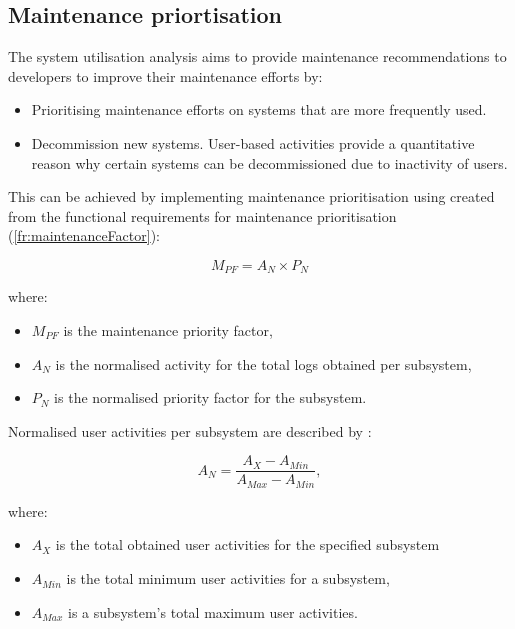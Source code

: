 \subsection{Maintenance priortisation}
The system utilisation analysis aims to provide maintenance recommendations to developers to improve their maintenance efforts by:

\begin{itemize}
	\item Prioritising maintenance efforts on systems that are more frequently used.
	\item Decommission new systems. User-based activities provide a quantitative reason why certain systems can be decommissioned due to inactivity of users.
\end{itemize}

This can be achieved by implementing maintenance prioritisation using  created from the functional requirements for maintenance prioritisation (\ref{fr:maintenanceFactor}):

\begin{equation}
	\label{eq:ch2_maintenanceFactorSimplified}
	M_{PF} = A_{N} \times P_{N}
\end{equation}

where:

\begin{itemize}
	\item $M_{PF}$ is the maintenance priority factor,
	\item $A_{N}$ is the normalised activity for the total logs obtained per subsystem,
	\item $P_{N}$ is the normalised priority factor for the subsystem.
\end{itemize}

Normalised user activities per subsystem are described by :

\begin{equation}
	\label{eq:ch2_eventNormalised}
	A_{N} = \frac{A_X - A_{Min}}{A_{Max} - A_{Min}},
\end{equation}

where:

\begin{itemize}
	\item $A_X$ is the total obtained user activities for the specified subsystem
	\item $A_{Min}$ is the total minimum user activities for a subsystem,
	\item $A_{Max}$ is a subsystem's total maximum user activities.
\end{itemize}

